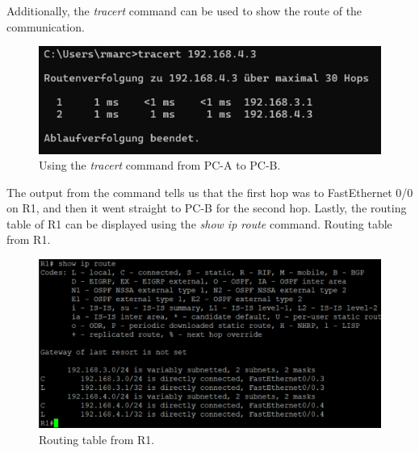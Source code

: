 \documentclass[a4paper]{article}
\newcommand{\abc}{\hfill \break}
\newcommand{\ii}{\textit}
\begin{document}
Additionally, the \ii{tracert} command can be used to show the route of the communication.
\begin{figure}[!htbp]
	\includegraphics[scale=0.55]{images/PC-A_tracert.png}
	\centering
	\caption{Using the \ii{tracert} command from PC-A to PC-B.}
\end{figure}\abc
The output from the command tells us that the first hop was to FastEthernet 0/0 on R1, and then it went straight to PC-B for the second hop.\abc
Lastly, the routing table of R1 can be displayed using the \ii{show ip route} command.
Routing table from R1.
\begin{figure}[!htbp]
	\includegraphics[scale=0.55]{images/R1_routing_table.png}
	\centering
	\caption{Routing table from R1.}
\end{figure}\abc
\newpage
\end{document}
